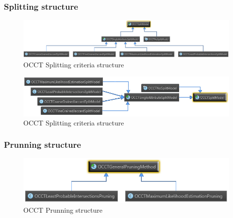 \documentclass[a4paper,12pt]{article}
\begin{document}
\begin{spacing}{1.5}
\subsubsection{Splitting structure}
\begin{figure}[!h]
    \centering
\includegraphics[width=1\textwidth]{Figures/OCCTSplitModelStructure}
    \caption{OCCT Splitting criteria structure}
    \label{fig:splitstr}
\end{figure}
\begin{figure}[!h]
    \centering
\includegraphics[width=1\textwidth]{Figures/OCCTSplitModelStructure2}
    \caption{OCCT Splitting criteria structure}
    \label{fig:splitstr}
\end{figure}
\clearpage
\subsubsection{Prunning structure}
\begin{figure}[!h]
    \centering
\includegraphics[width=1\textwidth]{Figures/OCCTPruneStructure}
    \caption{OCCT Prunning structure}
    \label{fig:prunestr}
\end{figure}


\end{spacing}
\end{document}
